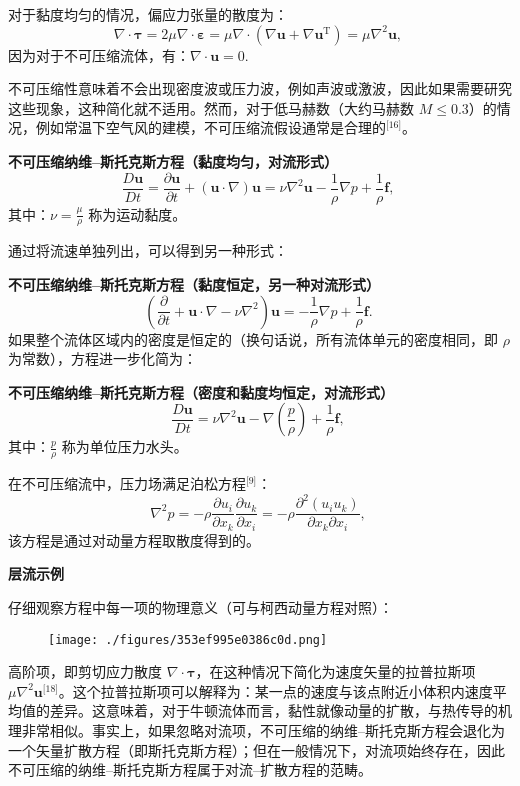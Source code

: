 对于黏度均匀的情况，偏应力张量的散度为：
$$
\nabla \cdot \boldsymbol{\tau}
= 2\mu \nabla \cdot \boldsymbol{\varepsilon}
= \mu \nabla \cdot
(\nabla \mathbf{u} + \nabla \mathbf{u}^{\mathrm{T}})
= \mu \nabla^2 \mathbf{u},~
$$
因为对于不可压缩流体，有：$\nabla \cdot \mathbf{u} = 0$.

不可压缩性意味着不会出现密度波或压力波，例如声波或激波，因此如果需要研究这些现象，这种简化就不适用。然而，对于低马赫数（大约马赫数 $M \leq 0.3$）的情况，例如常温下空气风的建模，不可压缩流假设通常是合理的\(^\text{[16]}\)。

\textbf{不可压缩纳维–斯托克斯方程（黏度均匀，对流形式）}
$$
\frac{D\mathbf{u}}{Dt}
= \frac{\partial \mathbf{u}}{\partial t}
+ (\mathbf{u} \cdot \nabla)\mathbf{u}
= \nu \nabla^2 \mathbf{u}
- \frac{1}{\rho} \nabla p
+ \frac{1}{\rho} \mathbf{f},~
$$
其中：$\nu = \frac{\mu}{\rho}$ 称为运动黏度。

通过将流速单独列出，可以得到另一种形式：

\textbf{不可压缩纳维–斯托克斯方程（黏度恒定，另一种对流形式）}
$$
\left(
\frac{\partial}{\partial t}
+ \mathbf{u} \cdot \nabla
- \nu \nabla^2
\right)\mathbf{u}
= -\frac{1}{\rho} \nabla p
+ \frac{1}{\rho} \mathbf{f}.~
$$
如果整个流体区域内的密度是恒定的（换句话说，所有流体单元的密度相同，即 $\rho$ 为常数），方程进一步化简为：

\textbf{不可压缩纳维–斯托克斯方程（密度和黏度均恒定，对流形式）}
$$
\frac{D\mathbf{u}}{Dt}
= \nu \nabla^2 \mathbf{u}
- \nabla\left(\frac{p}{\rho}\right)
+ \frac{1}{\rho} \mathbf{f},~
$$
其中：$\displaystyle \frac{p}{\rho}$ 称为单位压力水头。

在不可压缩流中，压力场满足泊松方程\(^\text{[9]}\)：
$$
\nabla^2 p
= -\rho
\frac{\partial u_i}{\partial x_k}
\frac{\partial u_k}{\partial x_i}
= -\rho
\frac{\partial^2 (u_i u_k)}{\partial x_k \partial x_i},~
$$
该方程是通过对动量方程取散度得到的。

\textbf{层流示例}

仔细观察方程中每一项的物理意义（可与柯西动量方程对照）：
\begin{figure}[ht]
\centering
\texttt{[image: ./figures/353ef995e0386c0d.png]}
\caption{} \label{fig_NWstks_2}
\end{figure}
高阶项，即剪切应力散度 $\nabla \cdot \boldsymbol{\tau}$，在这种情况下简化为速度矢量的拉普拉斯项 $\mu \nabla^2 \mathbf{u}$\(^\text{[18]}\)。这个拉普拉斯项可以解释为：某一点的速度与该点附近小体积内速度平均值的差异。这意味着，对于牛顿流体而言，黏性就像动量的扩散，与热传导的机理非常相似。事实上，如果忽略对流项，不可压缩的纳维–斯托克斯方程会退化为一个矢量扩散方程（即斯托克斯方程）；但在一般情况下，对流项始终存在，因此不可压缩的纳维–斯托克斯方程属于对流–扩散方程的范畴。

